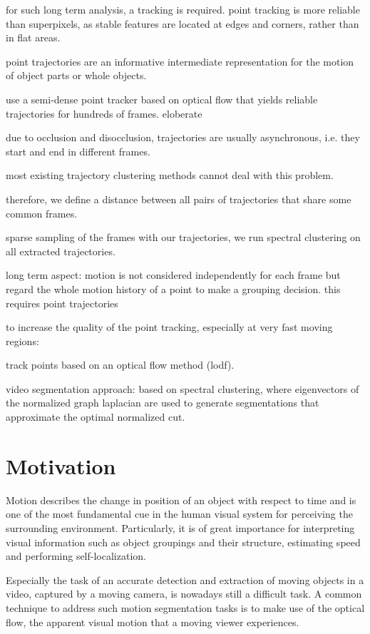 for such long term analysis, a tracking is required.
point tracking is more reliable than superpixels, as stable features are located at edges and corners, rather than in flat areas.

point trajectories are an informative intermediate representation for the motion of object parts or whole objects.

use a semi-dense point tracker based on optical flow that yields reliable trajectories for hundreds of frames.
eloberate

due to occlusion and disocclusion, 
trajectories are usually asynchronous, i.e. they start and end in different frames. 

most existing trajectory clustering methods cannot deal with this problem. 

therefore, we define a distance between all pairs of trajectories that share some common frames.

sparse sampling of the frames with our trajectories, 
we run spectral clustering on all extracted trajectories.


long term aspect: motion is not considered independently for each frame but regard the whole motion history of a point to make a grouping decision.
this requires point trajectories

to increase the quality of the point tracking, especially at very fast moving regions: 

track points based on an optical flow method (lodf). 

video segmentation approach: based on spectral clustering, where eigenvectors of the normalized graph laplacian are used to generate segmentations that approximate the optimal normalized cut.


\section{Motivation}

Motion describes the change in position of an object with respect to time and is one of the most fundamental cue in the human visual system for perceiving the surrounding environment. Particularly, it is of great importance for interpreting visual information such as object groupings and their structure, estimating speed and performing self-localization.

Especially the task of an accurate detection and extraction of moving objects in a video, captured by a moving camera, is nowadays still a difficult task. A common technique to address such motion segmentation tasks is to make use of the optical flow, the apparent visual motion that a moving viewer experiences. 



